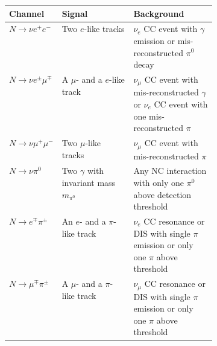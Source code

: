 \begin{table}
	\centering
	\caption[Decay channels with good discovery prospect and their signals and backgrounds]%
		{The decay channels with the best discovery prospect are listed here, together with their signatures %
			and most likely background events. For any HNL decay mode, no hadronic activity %
			such as nucleus recoil is present at the decay vertex.	}
	\label{tab:signals_backgrounds}
	\small
	\begin{longtable}{llp{0.4\linewidth}}
		\toprule
		Channel			& Signal	& Background	\\
		\midrule
		$N\to\nu e^+ e^-$	& {Two $e$-like tracks}	& %
					  {$\nu_e$ CC event with $\gamma$ emission or mis-reconstructed $\pi^0$ decay}	\\
		\addlinespace[0.8em]
		$N\to\nu e^\pm \mu^\mp$	& {A $\mu$- and a $e$-like track}	& %
					  {$\nu_\mu$ CC event with mis-reconstructed $\gamma$ %
						  or $\nu_e$ CC event with one mis-reconstructed $\pi$}	\\
		\addlinespace[0.8em]
		$N\to\nu \mu^+ \mu^-$	& {Two $\mu$-like tracks}	& %
					  {$\nu_\mu$ CC event with mis-reconstructed $\pi$}	\\
		\addlinespace[0.8em]
		$N\to\nu \pi^0$		& {Two $\gamma$ with invariant mass $m_{\pi^0}$} & %
					  {Any NC interaction with only one $\pi^0$ above detection threshold}	\\
		\addlinespace[0.8em]
		$N\to e^\mp \pi^\pm$	& {An $e$- and a $\pi$-like track}	& %
					  {$\nu_e$ CC resonance or DIS with single $\pi$ emission or only one $\pi$ above threshold}	\\
		\addlinespace[0.8em]
		$N\to\mu^\mp \pi^\pm$	& {A $\mu$- and a $\pi$-like track}	& %
					  {$\nu_\mu$ CC resonance or DIS with single $\pi$ emission or only one $\pi$ above threshold}	\\
		\bottomrule
	\end{longtable}
\end{table}


